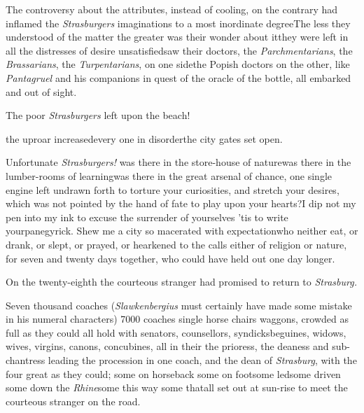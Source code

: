 \documentclass{article}
\begin{document}
The controversy about the attributes, \etc instead of
cooling, on the contrary had inflamed the \textit{Strasburgers}
imaginations to a most inordinate degree\tsk The less they
understood of the matter the greater was their wonder about
it\tsk they were left in all the distresses of desire
unsatisfied\tsh saw their doctors, the
\textit{Parchmentarians}, the \textit{Brassarians}, the
\textit{Turpentarians}, on one side\tsk the Popish
doctors\pb
on the other, like \textit{Pantagruel} and his companions in
quest of the oracle of the bottle, all embarked and out of
sight.

\tsh The poor \textit{Strasburgers} left upon the
beach!

\noindent
{}\break
\tsk the uproar
increased\tsk every one in disorder\tsk the city gates set
open.\tsk

Unfortunate \textit{Strasburgers!} was there in the
store-house of nature\tsk was there in the lumber-rooms of
learning\tsk was there in the great arsenal of chance, one
single engine left undrawn forth to torture your
curiosities, and stretch your desires, which was not pointed
by the hand of fate to play upon your hearts?\tsk I dip not
my pen into my ink to excuse the surrender of yourselves\tsk
’tis to write your\pb panegyrick. Shew me a city so macerated
with expectation\tsh who neither eat, or drank, or slept, or
prayed, or hearkened to the calls either of religion or
nature, for seven and twenty days together, who could have
held out one day longer.

On the twenty-eighth the courteous stranger had promised to
return to \textit{Strasburg.}

Seven thousand coaches (\textit{Slawkenber\-gius} must certainly have made some
mistake in his numeral characters) 7000\break
coaches single horse chairs\tsh{} waggons, crowded as full as they could all hold with senators, counsellors, 
syndicks\tsk beguines, widows, wives, virgins, canons,
concubines, all in their\break
{}
the prioress, the deaness and sub-chantress\pb
leading the procession in one coach, and the dean of \textit{Strasburg}, with the
four great \break
{}
as they could; some on horseback\tsh 
some on foot\tsk some led\tsk some driven\tsk
some down the \textit{Rhine}\tsk some this way\tsk
some that\tsk all set out at sun-rise to meet 
the courteous stranger on the road.
\end{document}
